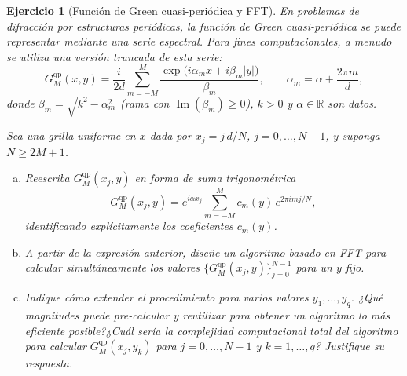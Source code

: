 \documentclass[12pt]{article}
\newtheorem{exercise}{Ejercicio}
\begin{document}
\begin{exercise}[Función de Green cuasi-periódica y FFT] En problemas de difracción por estructuras periódicas, la función de Green cuasi-periódica se puede representar mediante una serie espectral. Para fines computacionales, a menudo se utiliza una versión truncada de esta serie:
\[
G^{\mathrm{qp}}_M(x,y)=\frac{i}{2d}\sum_{m=-M}^{M}
\frac{\exp\!\bigl(i\alpha_m x+i\beta_m|y|\bigr)}{\beta_m},
\qquad
\alpha_m=\alpha+\frac{2\pi m}{d},
\]
donde $\beta_m=\sqrt{k^2-\alpha_m^2}$ (rama con $\operatorname{Im}(\beta_m)\ge 0$), $k>0$ y $\alpha\in\mathbb{R}$ son datos.

Sea una grilla uniforme en $x$ dada por $x_j=j\,d/N$, $j=0,\ldots,N-1$, y suponga $N\ge 2M+1$.

\begin{enumerate}[(a)]
\item Reescriba $G^{\mathrm{qp}}_M(x_j,y)$ en forma de suma trigonométrica
\[
G^{\mathrm{qp}}_M(x_j,y)=e^{i\alpha x_j}\sum_{m=-M}^{M} c_m(y)\,e^{2\pi i mj/N},
\]
identificando explícitamente los coeficientes $c_m(y)$.

\item A partir de la expresión anterior, diseñe un algoritmo basado en FFT para calcular simultáneamente los valores $\{G^{\mathrm{qp}}_M(x_j,y)\}_{j=0}^{N-1}$ para un $y$ fijo.

\item Indique cómo extender el procedimiento para varios valores $y_1,\ldots,y_q$. ¿Qué magnitudes puede pre-calcular y reutilizar para obtener un algoritmo lo más eficiente posible?¿Cuál sería la complejidad computacional total del algoritmo para calcular $G^{\mathrm{qp}}_M(x_j,y_k)$ para $j=0,\ldots,N-1$ y $k=1,\ldots,q$? Justifique su respuesta.
\end{enumerate}
\end{exercise}
\end{document}
